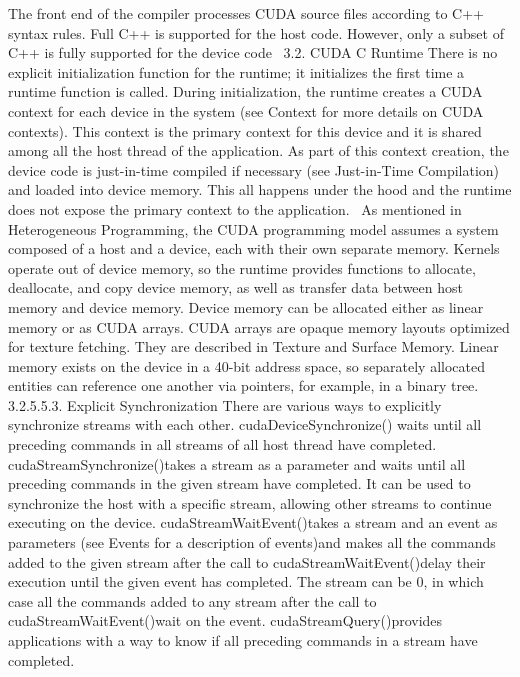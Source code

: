 \documentclass{article}
\begin{document}
The front end of the compiler processes CUDA source files according to C++ syntax rules. Full C++ is supported for the host code. However, only a subset of C++ is fully supported for the device code~\cite[p.~3.1.5]{CUDA18}
3.2. CUDA C Runtime
There is no explicit initialization function for the runtime; it initializes the first time a runtime function is called. During initialization, the runtime creates a CUDA context for each device in the system (see Context for more details on CUDA contexts). This context is the primary context for this device and it is shared among all the host thread of the application. As part of this context creation, the device code is just-in-time compiled if necessary (see Just-in-Time Compilation) and loaded into device memory. This all happens under the hood and the runtime does not expose the primary context to the application.~\cite[p.~3.2.1]{CUDA18}
As mentioned in Heterogeneous Programming, the CUDA programming model assumes a system composed of a host and a device, each with their own separate memory. Kernels operate out of device memory, so the runtime provides functions to allocate, deallocate, and copy device memory, as well as transfer data between host memory and device memory. Device memory can be allocated either as linear memory or as CUDA arrays. CUDA arrays are opaque memory layouts optimized for texture fetching. They are described in Texture and Surface Memory. Linear memory exists on the device in a 40-bit address space, so separately allocated entities can reference one another via pointers, for example, in a binary tree.~\cite[p.~3.2.2]{CUDA18}
3.2.5.5.3. Explicit Synchronization
There are various ways to explicitly synchronize streams with each other.
cudaDeviceSynchronize() waits until all preceding commands in all streams of all host thread have completed.
cudaStreamSynchronize()takes a stream as a parameter and waits until all preceding commands in the given stream have completed. It can be used to synchronize the host with a specific stream, allowing other streams to continue executing on the device.
cudaStreamWaitEvent()takes a stream and an event as parameters (see Events for a description of events)and makes all the commands added to the given stream after the call to cudaStreamWaitEvent()delay their execution until the given event has completed. The stream can be 0, in which case all the commands added to any stream after the call to cudaStreamWaitEvent()wait on the event.
cudaStreamQuery()provides applications with a way to know if all preceding commands in a stream have completed. 
\end{document}
